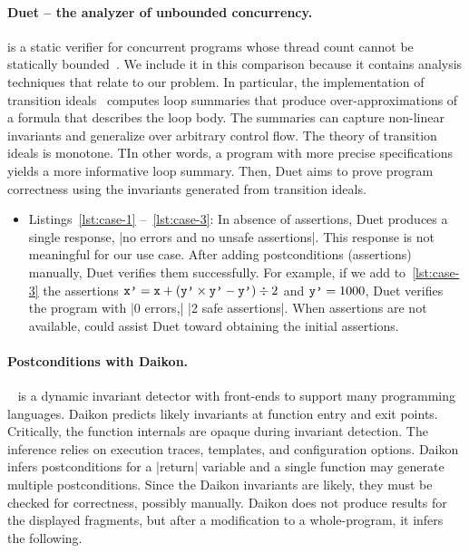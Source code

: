 \paragraph{Duet -- the analyzer of unbounded concurrency.}
 is a static verifier for concurrent programs whose thread count cannot be statically bounded~\cite{duet}.
We include it in this comparison because it contains analysis techniques that relate to our problem.
In particular, the implementation of {transition ideals}~\cite{cyphert2024}
computes {loop summaries} that produce over-approximations of a formula that describes the loop body.
The summaries can capture non-linear invariants and generalize over arbitrary control flow.
The theory of transition ideals is monotone.
TIn other words, a program with more precise specifications yields a more informative loop summary.
Then, Duet aims to prove program correctness using the invariants generated from transition ideals.

\begin{itemize}
\item Listings~\ref{lst:case-1} --~\ref{lst:case-3}:
    In absence of assertions, Duet produces a single response, \pr|no errors and no unsafe assertions|.
    This response is not meaningful for our use case.
    After adding postconditions (assertions) manually, Duet verifies them successfully.
    For example, if we add to~\autoref{lst:case-3} the assertions
    \(\prm{x'}=\prm{x}+(\prm{y'}\times\prm{y'}-\prm{y'}) \div 2 \) and \(\prm{y'}=1000 \),
    Duet verifies the program with \pr|0 errors,| \pr|2 safe assertions|.
    When assertions are not available, \impl could assist Duet toward obtaining the initial assertions.
\end{itemize}

\paragraph{Postconditions with Daikon.}
~\cite{ernst2007,daikon} is a dynamic invariant detector with front-ends to support many programming languages.
Daikon predicts {likely} invariants at function entry and exit points.
Critically, the function internals are opaque during invariant detection.
The inference relies on execution traces, templates, and configuration options.
Daikon infers postconditions for a \pr|return| variable
and a single function may generate multiple postconditions.
Since the Daikon invariants are likely, they must be checked for correctness, possibly manually.
Daikon does not produce results for the displayed fragments, but after a modification to a whole-program,
it infers the following.

